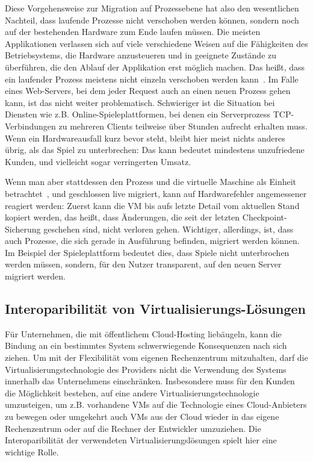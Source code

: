 Diese Vorgehensweise zur Migration auf Prozessebene hat also den
wesentlichen Nachteil, dass laufende Prozesse nicht verschoben werden
können, sondern noch auf der bestehenden Hardware zum Ende laufen
müssen. Die meisten Applikationen verlassen sich auf viele
verschiedene Weisen auf die Fähigkeiten des Betriebsystems, die
Hardware anzusteueren und in geeignete Zustände zu überführen, die den
Ablauf der Applikation erst möglich machen. Das heißt, dass ein
laufender Prozess meistens nicht einzeln verschoben werden
kann~\cite{hansen2002nomadic}. Im Falle eines Web-Servers, bei dem
jeder Request auch an einen neuen Prozess gehen kann, ist das nicht
weiter problematisch. Schwieriger ist die Situation bei Diensten wie
z.B. Online-Spieleplattformen, bei denen ein Serverprozess
TCP-Verbindungen zu mehreren Clients teilweise über Stunden aufrecht
erhalten muss. Wenn ein Hardwareausfall kurz bevor steht, bleibt hier
meist nichts anderes übrig, als das Spiel zu unterbrechen: Das kann
bedeutet mindestens unzufriedene Kunden, und vielleicht sogar
verringerten Umsatz.

Wenn man aber stattdessen den Prozess und die virtuelle Maschine als
Einheit betrachtet~\cite{nelson2005fast}, und geschlossen live
migriert, kann auf Hardwarefehler angemessener reagiert werden: Zuerst
kann die VM bis aufs letzte Detail vom aktuellen Stand kopiert werden,
das heißt, dass Änderungen, die seit der letzten Checkpoint-Sicherung
geschehen sind, nicht verloren gehen. Wichtiger, allerdings, ist, dass
auch Prozesse, die sich gerade in Ausführung befinden, migriert werden
können. Im Beispiel der Spieleplattform bedeutet dies, dass Spiele
nicht unterbrochen werden müssen, sondern, für den Nutzer transparent,
auf den neuen Server migriert werden.

\subsection{Interoparibilität von Virtualisierungs-Lösungen}
Für Unternehmen, die mit öffentlichem Cloud-Hosting liebäugeln, kann
die Bindung an ein bestimmtes System schwerwiegende Konsequenzen nach
sich ziehen. Um mit der Flexibilität vom eigenen Rechenzentrum
mitzuhalten, darf die Virtualisierungstechnologie des Providers nicht
die Verwendung des Systems innerhalb das Unternehmens
einschränken. Insbesondere muss für den Kunden die Möglichkeit
bestehen, auf eine andere Virtualisierungstechnologie umzusteigen, um
z.B. vorhandene VMs auf die Technologie eines Cloud-Anbieters zu
bewegen oder umgekehrt auch VMs aus der Cloud wieder in das eigene
Rechenzentrum oder auf die Rechner der Entwickler umzuziehen. Die
Interoparibilität der verwendeten Virtualisierungslösungen spielt hier
eine wichtige Rolle.

